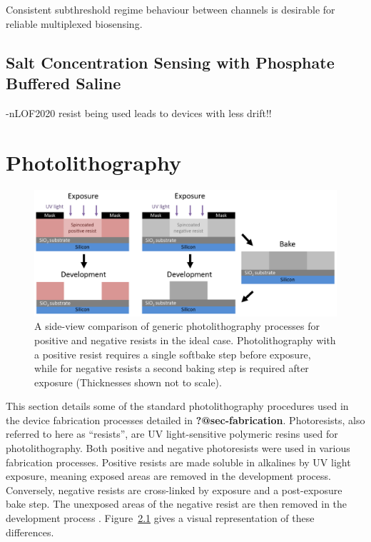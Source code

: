 \documentclass[
  a4paper,
]{scrbook}
\begin{document}
Consistent subthreshold regime behaviour between channels is desirable
for reliable multiplexed biosensing.

\hypertarget{sec-dummy-sensing}{%
\section{Salt Concentration Sensing with Phosphate Buffered
Saline}\label{sec-dummy-sensing}}

-nLOF2020 resist being used leads to devices with less drift!!

\appendix
{}

\hypertarget{sec-photolithography}{%
\chapter{Photolithography}\label{sec-photolithography}}

\begin{figure}

{\centering \includegraphics{./figures/app1/positive-negative-photolithography.png}

}

\caption{\label{fig-photolithography-types}A side-view comparison of
generic photolithography processes for positive and negative resists in
the ideal case. Photolithography with a positive resist requires a
single softbake step before exposure, while for negative resists a
second baking step is required after exposure (Thicknesses shown not to
scale).}

\end{figure}

This section details some of the standard photolithography procedures
used in the device fabrication processes detailed in
\textbf{?@sec-fabrication}. Photoresists, also referred to here as
``resists'', are UV light-sensitive polymeric resins used for
photolithography. Both positive and negative photoresists were used in
various fabrication processes. Positive resists are made soluble in
alkalines by UV light exposure, meaning exposed areas are removed in the
development process. Conversely, negative resists are cross-linked by
exposure and a post-exposure bake step. The unexposed areas of the
negative resist are then removed in the development process
\autocite{Microchemicals}. Figure~\ref{fig-photolithography-types} gives
a visual representation of these differences.
\end{document}
